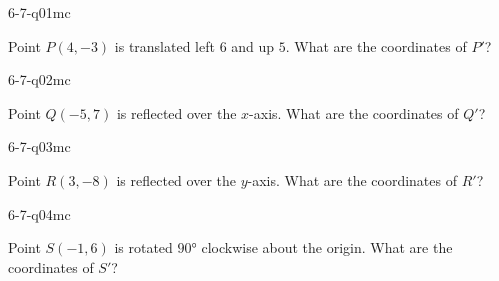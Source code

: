 

\begin{practiceQuestion}{6-7-q01}{mc}
\begin{questionText}
Point $P(4, -3)$ is translated left $6$ and up $5$. What are the coordinates of $P'$?
\end{questionText}
\end{practiceQuestion}

\begin{practiceQuestion}{6-7-q02}{mc}
\begin{questionText}
Point $Q(-5, 7)$ is reflected over the $x$-axis. What are the coordinates of $Q'$?
\end{questionText}
\end{practiceQuestion}

\begin{practiceQuestion}{6-7-q03}{mc}
\begin{questionText}
Point $R(3, -8)$ is reflected over the $y$-axis. What are the coordinates of $R'$?
\end{questionText}
\end{practiceQuestion}

\begin{practiceQuestion}{6-7-q04}{mc}
\begin{questionText}
Point $S(-1, 6)$ is rotated $90°$ clockwise about the origin. What are the coordinates of $S'$?
\end{questionText}
\end{practiceQuestion}

